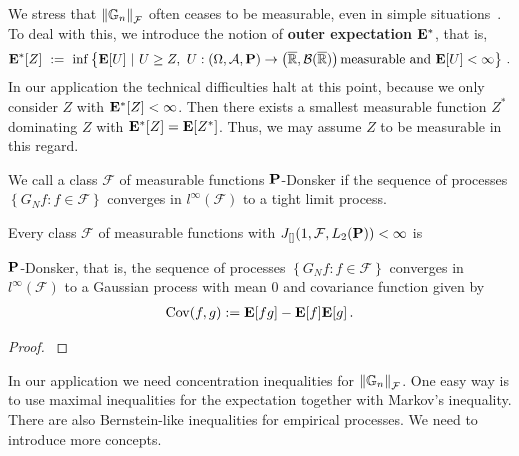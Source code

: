 \begin{remark}
We stress that 
$
  \norm{\G_n}_\mathcal{F}
$
often ceases to be measurable, even in simple situations~\cite[page 3]{vaart2013}.
To deal with this, we introduce the notion of \textbf{outer expectation} $\E^*$, that is,
\begin{gather}
  \E^*[Z]
  \ 
  :=
  \ 
    \inf
  \left\{ 
    \E[U]
  \ 
  \lvert
  \ 
    U\ge Z,
    \ 
    U:
  \left( 
    \Omega,
    \mathcal{A},
    \P
  \right)
  \to 
  \left( 
    \overline{\R},
    \mathcal{B}(\overline{\R})
  \right)
  \text{measurable and}
  \ 
  \E[U]<\infty
  \right\}
  \,.
\end{gather}
In our application the technical difficulties halt at this point, because we only consider $Z$ with $\E^*[Z]<\infty$. Then there exists a smallest measurable function $Z^*$ dominating $Z$ with
$\E^*[Z]=\E[Z^*]$. Thus, we may assume $Z$ to be measurable in this regard.
\begin{definition}
  We call a class 
  $\mathcal{F}$ of measurable functions 
$\P$-Donsker
if the sequence of processes 
$\left\{ G_N f \colon f\in\mathcal{F}\right\}$
converges in
$l^\infty(\mathcal{F})$
to a tight limit process.
\end{definition}

\begin{theorem}
  Every class $\mathcal{F}$ of measurable functions 
  with
  $
    J
    _{[]}
    (
    1
    ,
    \mathcal{F}
    ,
    L_2(\P)
    )
    <\infty
  $
  is

  $\P$-Donsker, that is,
  the sequence of processes 
$\left\{ G_N f \colon f\in\mathcal{F}\right\}$
  converges 
  in
$l^\infty(\mathcal{F})$
to a Gaussian process with mean 0 and covariance function given by
\begin{gather}
  \mathrm{Cov}(f,g)
  :=
  \E[fg]-\E[f]\E[g]
  \,.
\end{gather}
\end{theorem}
\begin{proof}
  \cite[Theorem~19.5]{Vaart2000}
\end{proof}



\end{remark}
In our application we need concentration inequalities for 
$
  \norm{\G_n}_\mathcal{F}
$.
One easy way is to use maximal inequalities for the expectation together with Markov's inequality. There are also Bernstein-like inequalities for empirical processes. We need to introduce more concepts.

